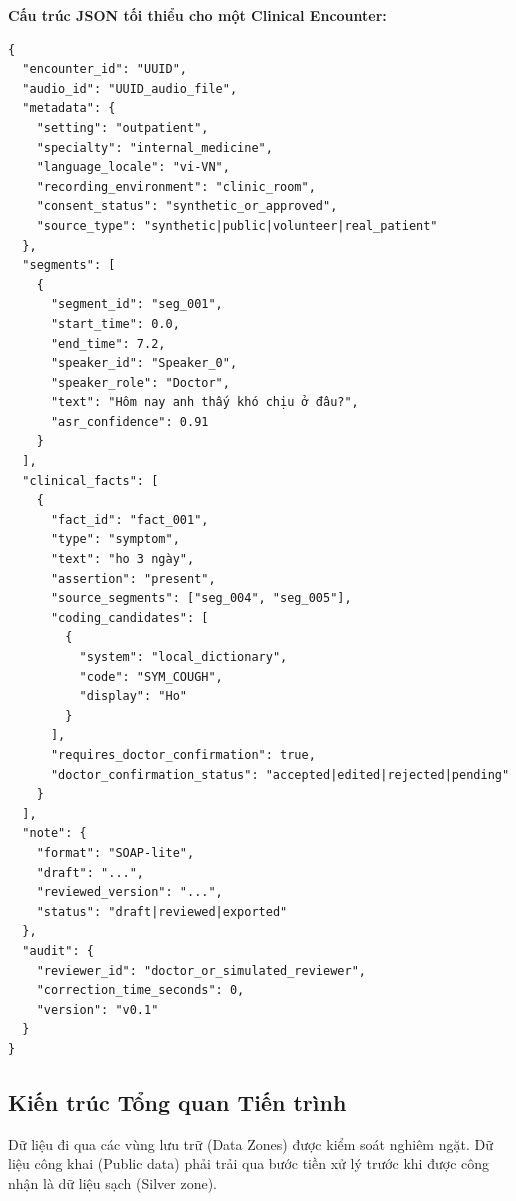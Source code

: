 \documentclass[12pt,a4paper]{article}
\begin{document}
\textbf{Cấu trúc JSON tối thiểu cho một Clinical Encounter:}
\begin{verbatim}
{
  "encounter_id": "UUID",
  "audio_id": "UUID_audio_file",
  "metadata": {
    "setting": "outpatient",
    "specialty": "internal_medicine",
    "language_locale": "vi-VN",
    "recording_environment": "clinic_room",
    "consent_status": "synthetic_or_approved",
    "source_type": "synthetic|public|volunteer|real_patient"
  },
  "segments": [
    {
      "segment_id": "seg_001",
      "start_time": 0.0,
      "end_time": 7.2,
      "speaker_id": "Speaker_0",
      "speaker_role": "Doctor",
      "text": "Hôm nay anh thấy khó chịu ở đâu?",
      "asr_confidence": 0.91
    }
  ],
  "clinical_facts": [
    {
      "fact_id": "fact_001",
      "type": "symptom",
      "text": "ho 3 ngày",
      "assertion": "present",
      "source_segments": ["seg_004", "seg_005"],
      "coding_candidates": [
        {
          "system": "local_dictionary",
          "code": "SYM_COUGH",
          "display": "Ho"
        }
      ],
      "requires_doctor_confirmation": true,
      "doctor_confirmation_status": "accepted|edited|rejected|pending"
    }
  ],
  "note": {
    "format": "SOAP-lite",
    "draft": "...",
    "reviewed_version": "...",
    "status": "draft|reviewed|exported"
  },
  "audit": {
    "reviewer_id": "doctor_or_simulated_reviewer",
    "correction_time_seconds": 0,
    "version": "v0.1"
  }
}
\end{verbatim}

\subsection{Kiến trúc Tổng quan Tiến trình}

Dữ liệu đi qua các vùng lưu trữ (Data Zones) được kiểm soát nghiêm ngặt. Dữ liệu công khai (Public data) phải trải qua bước tiền xử lý trước khi được công nhận là dữ liệu sạch (Silver zone).
\end{document}
